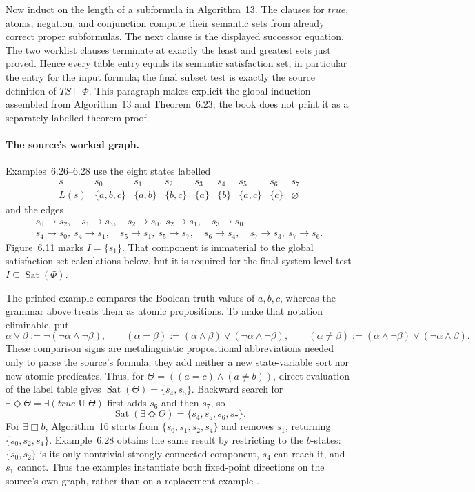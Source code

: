 Now induct on the length of a subformula in Algorithm~13.  The clauses for
\(true\), atoms, negation, and conjunction compute their semantic sets from
already correct proper subformulas.  The next clause is the displayed
successor equation.  The two worklist clauses terminate at exactly the least
and greatest sets just proved.  Hence every table entry equals its semantic
satisfaction set, in particular the entry for the input formula; the final
subset test is exactly the source definition of \(TS\models\Phi\).  This
paragraph makes explicit the global induction assembled from Algorithm~13 and
Theorem~6.23; the book does not print it as a separately labelled theorem
proof.

\paragraph{The source's worked graph.}
Examples~6.26--6.28 use the eight states labelled
\[
\begin{array}{c|cccccccc}
s&s_0&s_1&s_2&s_3&s_4&s_5&s_6&s_7\\\hline
L(s)&\{a,b,c\}&\{a,b\}&\{b,c\}&\{a\}&
      \{b\}&\{a,c\}&\{c\}&\varnothing
\end{array}
\]
and the edges
\[
\begin{gathered}
s_0\to s_2,\quad s_1\to s_3,\quad
s_2\to s_0,\ s_2\to s_1,\quad s_3\to s_0,\\
s_4\to s_0,\ s_4\to s_1,\quad
s_5\to s_1,\ s_5\to s_7,\quad s_6\to s_4,\quad
s_7\to s_3,\ s_7\to s_6.
\end{gathered}
\]
Figure~6.11 marks \(I=\{s_1\}\).  That component is immaterial to the
global satisfaction-set calculations below, but it is required for the final
system-level test \(I\subseteq\operatorname{Sat}(\Phi)\).

The printed example compares the Boolean truth values of \(a,b,c\), whereas
the grammar above treats them as atomic propositions.  To make that notation
eliminable, put
\[
 \alpha\lor\beta:=\neg(\neg\alpha\land\neg\beta),\qquad
 (\alpha=\beta):=(\alpha\land\beta)\lor(\neg\alpha\land\neg\beta),
 \qquad
 (\alpha\ne\beta):=(\alpha\land\neg\beta)\lor(\neg\alpha\land\beta).
\]
These comparison signs are metalinguistic propositional abbreviations needed
only to parse the source's formula; they add neither a new state-variable sort
nor new atomic predicates.  Thus, for
\(\Theta=((a=c)\land(a\ne b))\), direct evaluation of the label table gives
\(\operatorname{Sat}(\Theta)=\{s_4,s_5\}\).  Backward search for
\(\exists\Diamond\Theta=\exists(true\mathbin{U}\Theta)\) first adds \(s_6\)
and then \(s_7\), so
\[
 \operatorname{Sat}(\exists\Diamond\Theta)
   =\{s_4,s_5,s_6,s_7\}.
\]
For \(\exists\Box b\), Algorithm~16 starts from
\(\{s_0,s_1,s_2,s_4\}\) and removes \(s_1\), returning
\(\{s_0,s_2,s_4\}\).  Example~6.28 obtains the same result by restricting
to the \(b\)-states: \(\{s_0,s_2\}\) is its only nontrivial strongly
connected component, \(s_4\) can reach it, and \(s_1\) cannot.  Thus the
examples instantiate both fixed-point directions on the source's own graph,
rather than on a replacement example \cite[pp.~349--354]{BaierKatoen2008}.

